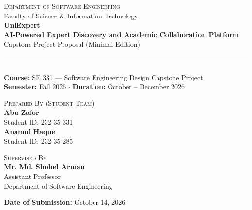 \documentclass[11pt,a4paper]{article}
\begin{document}
\begin{titlepage}
    \centering
    \vspace*{1.5cm}
    
    {\large\scshape Department of Software Engineering}\\[0.2cm]
    {\normalsize Faculty of Science \& Information Technology}\\[2.5cm]
    
    {\Huge\bfseries\color{primary} UniExpert}\\[0.5cm]
    {\LARGE\bfseries\color{darkslate} AI-Powered Expert Discovery and Academic Collaboration Platform}\\[0.8cm]
    {\large\color{secondary} Capstone Project Proposal (Minimal Edition)}\\[0.4cm]
    \rule{3.2in}{0.5pt}\\[0.6cm]
    
    {\normalsize\textbf{Course:} SE 331 --- Software Engineering Design Capstone Project}\\[0.25cm]
    {\normalsize\textbf{Semester:} Fall 2026 \quad $\cdot$ \quad \textbf{Duration:} October -- December 2026}\\[3.5cm]
    
    \begin{minipage}[t]{0.48\textwidth}
        \begin{flushleft}
            {\small\scshape Prepared By (Student Team)}\\[0.35cm]
            \textbf{Abu Zafor}\\
            {\small Student ID: 232-35-331}\\[0.25cm]
            \textbf{Anamul Haque}\\
            {\small Student ID: 232-35-285}
        \end{flushleft}
    \end{minipage}
    \hfill
    \begin{minipage}[t]{0.45\textwidth}
        \begin{flushright}
            {\small\scshape Supervised By}\\[0.35cm]
            \textbf{Mr. Md. Shohel Arman}\\[0.12cm]
            {\small Assistant Professor}\\
            {\small Department of Software Engineering}
        \end{flushright}
    \end{minipage}
    
    \vfill
    
    {\small\textbf{Date of Submission:} October 14, 2026}
    \vspace*{1.0cm}
\end{titlepage}
\end{document}
